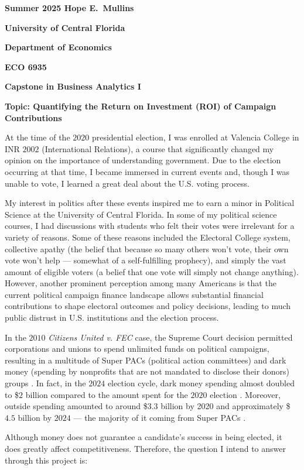 \documentclass[11pt]{article}
\begin{document}
\pagestyle{empty}
{\noindent\bf Summer 2025  \hfill Hope E.~Mullins}
\vskip 16pt
\centerline{\bf University of Central Florida}
\centerline{\bf Department of Economics}
\vskip 16pt
\centerline{\bf ECO 6935}
\centerline{\bf Capstone in Business Analytics I}
\vskip 10pt
\centerline{\bf Topic: Quantifying the Return on Investment (ROI) of Campaign Contributions}
\vskip 32pt
\doublespacing
\indent At the time of the $2020$ presidential election, I was enrolled at Valencia College in INR $2002$ (International Relations), a course that significantly changed my opinion on the importance of understanding government. Due to the election occurring at that time, I became immersed in current events and, though I was unable to vote, I learned a great deal about the U.S. voting process.

\vskip 5pt
\indent My interest in politics after these events inspired me to earn a minor in Political Science at the University of Central Florida. In some of my political science courses, I had discussions with students who felt their votes were irrelevant for a variety of reasons. Some of these reasons included the Electoral College system, collective apathy (the belief that because so many others won't vote, their own vote won't help --- somewhat of a self-fulfilling prophecy), and simply the vast amount of eligible voters (a belief that one vote will simply not change anything). However, another prominent perception among many Americans is that the current political campaign finance landscape allows substantial financial contributions to shape electoral outcomes and policy decisions, leading to much public distrust in U.S. institutions and the election process.

\vskip 5pt
\indent In the $2010$ \textit{Citizens United v. FEC} case, the Supreme Court decision permitted corporations and unions to spend unlimited funds on political campaigns, resulting in a multitude of Super PACs (political action committees) and dark money (spending by nonprofits that are not mandated to disclose their donors) groups \cite{citizensunited2010}. In fact, in the $2024$ election cycle, dark money spending almost doubled to \$$2$ billion compared to the amount spent for the $2020$ election \cite{brennancenter2024}. Moreover, outside spending amounted to around \$$3.3$ billion by 2020 and approximately \$$4.5$ billion by $2024$ --- the majority of it coming from Super PACs \cite{opensecrets2025}.  

\vskip 5pt
\indent Although money does not guarantee a candidate's success in being elected, it does greatly affect competitiveness. Therefore, the question I intend to answer through this project is:
\end{document}
